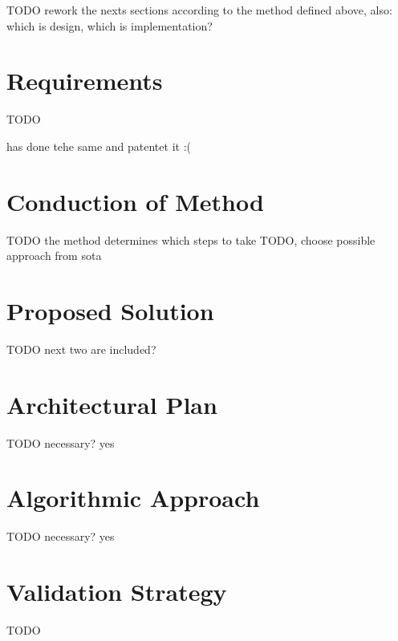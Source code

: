  
 
 TODO rework the nexts sections according to the method defined above, also: which is design, which is implementation?

\section{Requirements}
TODO

\autocite[][]{xang2016trafficlist} has done tehe same and patentet it :(

\section{Conduction of Method}
TODO the method determines which steps to take
TODO, choose possible approach from sota

\section{Proposed Solution}
TODO next two are included?

\section{Architectural Plan}
TODO necessary? yes

\section{Algorithmic Approach}
TODO necessary? yes

\section{Validation Strategy}

TODO